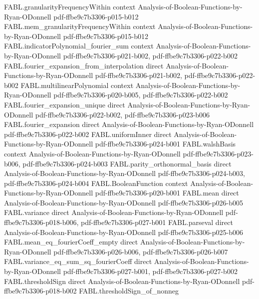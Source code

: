 \begin{theorem}
\proofstep
  {FABL.granularityFrequencyWithin}
  {context}
  {Analysis-of-Boolean-Functions-by-Ryan-ODonnell}
  {pdf-ffbe9c7b3306-p015-b012}
\proofstep
  {FABL.mem_granularityFrequencyWithin}
  {context}
  {Analysis-of-Boolean-Functions-by-Ryan-ODonnell}
  {pdf-ffbe9c7b3306-p015-b012}
\proofstep
  {FABL.indicatorPolynomial_fourier_sum}
  {context}
  {Analysis-of-Boolean-Functions-by-Ryan-ODonnell}
  {pdf-ffbe9c7b3306-p021-b002,
    pdf-ffbe9c7b3306-p022-b002}
\proofstep
  {FABL.fourier_expansion_from_interpolation}
  {direct}
  {Analysis-of-Boolean-Functions-by-Ryan-ODonnell}
  {pdf-ffbe9c7b3306-p021-b002,
    pdf-ffbe9c7b3306-p022-b002}
\proofstep
  {FABL.multilinearPolynomial}
  {context}
  {Analysis-of-Boolean-Functions-by-Ryan-ODonnell}
  {pdf-ffbe9c7b3306-p020-b005,
    pdf-ffbe9c7b3306-p022-b002}
\proofstep
  {FABL.fourier_expansion_unique}
  {direct}
  {Analysis-of-Boolean-Functions-by-Ryan-ODonnell}
  {pdf-ffbe9c7b3306-p022-b002,
    pdf-ffbe9c7b3306-p023-b006}
\proofstep
  {FABL.fourier_expansion}
  {direct}
  {Analysis-of-Boolean-Functions-by-Ryan-ODonnell}
  {pdf-ffbe9c7b3306-p022-b002}
\proofstep
  {FABL.uniformInner}
  {direct}
  {Analysis-of-Boolean-Functions-by-Ryan-ODonnell}
  {pdf-ffbe9c7b3306-p024-b001}
\proofstep
  {FABL.walshBasis}
  {context}
  {Analysis-of-Boolean-Functions-by-Ryan-ODonnell}
  {pdf-ffbe9c7b3306-p023-b006,
    pdf-ffbe9c7b3306-p024-b003}
\proofstep
  {FABL.parity_orthonormal_basis}
  {direct}
  {Analysis-of-Boolean-Functions-by-Ryan-ODonnell}
  {pdf-ffbe9c7b3306-p024-b003,
    pdf-ffbe9c7b3306-p024-b004}
\proofstep
  {FABL.BooleanFunction}
  {context}
  {Analysis-of-Boolean-Functions-by-Ryan-ODonnell}
  {pdf-ffbe9c7b3306-p020-b001}
\proofstep
  {FABL.mean}
  {direct}
  {Analysis-of-Boolean-Functions-by-Ryan-ODonnell}
  {pdf-ffbe9c7b3306-p026-b005}
\proofstep
  {FABL.variance}
  {direct}
  {Analysis-of-Boolean-Functions-by-Ryan-ODonnell}
  {pdf-ffbe9c7b3306-p018-b006,
    pdf-ffbe9c7b3306-p027-b001}
\proofstep
  {FABL.parseval}
  {direct}
  {Analysis-of-Boolean-Functions-by-Ryan-ODonnell}
  {pdf-ffbe9c7b3306-p025-b006}
\proofstep
  {FABL.mean_eq_fourierCoeff_empty}
  {direct}
  {Analysis-of-Boolean-Functions-by-Ryan-ODonnell}
  {pdf-ffbe9c7b3306-p026-b006,
    pdf-ffbe9c7b3306-p026-b007}
\proofstep
  {FABL.variance_eq_sum_sq_fourierCoeff}
  {direct}
  {Analysis-of-Boolean-Functions-by-Ryan-ODonnell}
  {pdf-ffbe9c7b3306-p027-b001,
    pdf-ffbe9c7b3306-p027-b002}
\proofstep
  {FABL.thresholdSign}
  {direct}
  {Analysis-of-Boolean-Functions-by-Ryan-ODonnell}
  {pdf-ffbe9c7b3306-p018-b002}
\proofstep
  {FABL.thresholdSign_of_nonneg}

\end{theorem}
